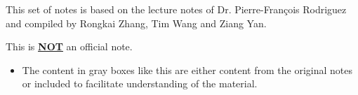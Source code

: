 \thispagestyle{empty}
This set of notes is based on the lecture notes of Dr. Pierre-François Rodriguez and compiled by Rongkai Zhang, Tim Wang and Ziang Yan.  

This is \underline{\bf NOT} an official note.

\begin{unexaminable}
\begin{itemize}
    \item The content in gray boxes like this are either content from the original notes or included to facilitate understanding of the material.
\end{itemize}
\end{unexaminable}  

